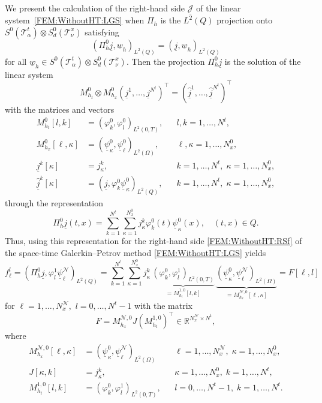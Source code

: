 \documentclass[a4paper,11pt]{article}
\newcommand{\R}{\mathbb R}
\renewcommand{\vec}[1]{\underline{#1}}
\begin{document}
We present the calculation of the right-hand side $\vec{\mathcal J}$ of the linear system~\eqref{FEM:WithoutHT:LGS} when $\Pi_h$ is the $L^2(Q)$ projection onto $S^0(\mathcal T^t_\alpha) \otimes S_d^0(\mathcal T^x_\nu)$ satisfying
\[
    (\Pi_h^0 \vec j, \vec w_h)_{L^2(Q)} = (\vec j, \vec w_h)_{L^2(Q)}
\]
for all $ \vec w_h \in S^0(\mathcal T^t_\alpha) \otimes S_d^0(\mathcal T^x_\nu).$ Then the projection $\Pi_h^0 \vec j $ is the solution of the linear system
\begin{equation} \label{FEM:WithoutHT:jProjKonst}
	M_{h_t}^0 \otimes M_{h_x}^0 (\vec j^1, \dots, \vec j^{N^t})^\top = (\hat{\vec j}^1,\dots, \hat{ \vec j}^{N^t})^\top
\end{equation}
with the matrices and vectors
\begin{align*}
	M_{h_t}^0[l,k] &= (\varphi^0_k,\varphi^0_l)_{L^2(0,T)},  &&l,k=1,\dots,N^t, \\
	M_{h_x}^0[\ell,\kappa] &= (\vec \psi^0_\kappa, \vec \psi^0_\ell)_{L^2(\Omega)},  &&\ell,\kappa=1,\dots,N_x^0, \\
	\vec j^k[\kappa] &= j^k_\kappa ,  &&k=1,\dots,N^t, \; \kappa=1,\dots, N_x^0, \\
	\hat{\vec j}^k[\kappa] &= (\vec j, \varphi^0_k \vec \psi^0_\kappa)_{L^2(Q)} ,  &&k=1,\dots,N^t, \; \kappa=1,\dots, N_x^0,
\end{align*}
through the representation
\begin{equation*}
	\Pi_h^0 \vec j(t,x) = \sum_{k=1}^{N^t} \sum_{\kappa=1}^{N_x^0} j^k_\kappa \varphi^0_k(t) \vec \psi^0_\kappa(x), \quad (t,x) \in Q.
\end{equation*}
Thus, using this representation for the right-hand side \eqref{FEM:WithoutHT:RSf} of the space-time Galerkin--Petrov method \eqref{FEM:WithoutHT:LGS} yields
\begin{equation*}
	f_\ell^l = (\Pi_h^0 \vec j, \varphi^1_l \vec \psi^\mathcal{N}_{\ell} )_{L^2(Q)} =  \sum_{k=1}^{N^t} \sum_{\kappa=1}^{N_x^0} j^k_\kappa \, \underbrace{ (\varphi^0_k, \varphi^1_l)_{L^2(0,T)}}_{= M_{h_t}^{1,0}[l,k]} \, \underbrace{ (\vec \psi^0_\kappa, \vec \psi^\mathcal{N}_{\ell})_{L^2(\Omega)}}_{=M_{h_x}^{\mathcal{N},0}[\ell,\kappa]}  = F[\ell,l]
\end{equation*}
for $\ell=1,\dots,N_x^{\mathcal{N}},$ $l = 0,\dots, N^t-1$ with the matrix
\begin{equation*}
	F = M_{h_x}^{\mathcal{N},0} J ( M_{h_t}^{1,0})^\top  \in \R^{N_x^{\mathcal{N}} \times N^t},
\end{equation*}
where
\begin{align}
	M_{h_x}^{\mathcal{N},0}[\ell,\kappa] &= (\vec \psi^0_\kappa, \vec \psi^\mathcal{N}_{\ell})_{L^2(\Omega)}  &&\ell=1,\dots,N_x^{\mathcal{N}}, \; \kappa=1,\dots,N_x^0, \label{FEM:WithoutHT:MasseN0} \\
	J[\kappa,k] &= j_\kappa^k,  &&\kappa=1,\dots,N_x^0, \; k=1,\dots, N^t, \label{FEM:WithoutHT:JKonst} \\
	M_{h_t}^{1,0}[l,k] &= (\varphi^0_k, \varphi^1_l)_{L^2(0,T)}, &&l=0,\dots,N^t-1, \; k=1,\dots, N^t.  \nonumber
\end{align}
\end{document}
